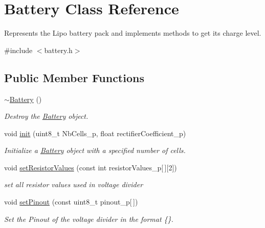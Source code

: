 \hypertarget{class_battery}{}\section{Battery Class Reference}
\label{class_battery}


Represents the Lipo battery pack and implements methods to get its charge level.  




{\ttfamily \#include $<$battery.\+h$>$}

\subsection*{Public Member Functions}
\begin{DoxyCompactItemize}
\item 
\mbox{\label{class_battery_a637d8766eb5cbdb33ab2a19a30622bc3}} 
\hyperlink{class_battery_a637d8766eb5cbdb33ab2a19a30622bc3}{$\sim$\+Battery} ()
\begin{DoxyCompactList}\small\item\em Destroy the \hyperlink{class_battery}{Battery} object. \end{DoxyCompactList}\item 
void \hyperlink{class_battery_aed541975df2c26475cbc0c37a9ddf659}{init} (uint8\+\_\+t Nb\+Cells\+\_\+p, float rectifier\+Coefficient\+\_\+p)
\begin{DoxyCompactList}\small\item\em Initialize a \hyperlink{class_battery}{Battery} object with a specified number of cells. \end{DoxyCompactList}\item 
void \hyperlink{class_battery_afb257ecd2eab7ed446d15ea9e78cc074}{set\+Resistor\+Values} (const int resistor\+Values\+\_\+p\mbox{[}$\,$\mbox{]}\mbox{[}2\mbox{]})
\begin{DoxyCompactList}\small\item\em set all resistor values used in voltage divider \end{DoxyCompactList}\item 
void \hyperlink{class_battery_a580d9582fbcf2c5f8185e3007852f73d}{set\+Pinout} (const uint8\+\_\+t pinout\+\_\+p\mbox{[}$\,$\mbox{]})
\begin{DoxyCompactList}\small\item\em Set the Pinout of the voltage divider in the format \{\}. \end{DoxyCompactList}\item 

\end{DoxyCompactItemize}

